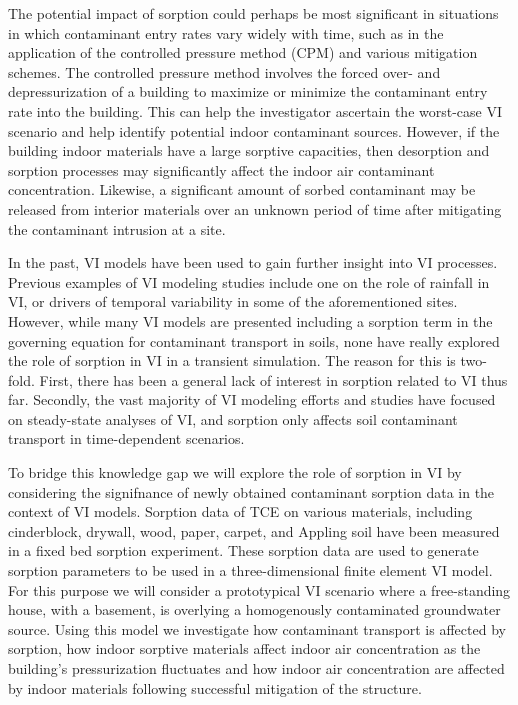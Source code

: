 The potential impact of sorption could perhaps be most significant in situations in which contaminant entry rates vary widely with time, such as in the application of the controlled pressure method (CPM) and various mitigation schemes.
The controlled pressure method involves the forced over- and depressurization of a building to maximize or minimize the contaminant entry rate into the building.
This can help the investigator ascertain the worst-case VI scenario and help identify potential indoor contaminant sources\cite{mchugh_recent_2017,holton_long-term_2015}.
However, if the building indoor materials have a large sorptive capacities, then desorption and sorption processes may significantly affect the indoor air contaminant concentration.
Likewise, a significant amount of sorbed contaminant may be released from interior materials over an unknown period of time after mitigating the contaminant intrusion at a site\cite{meininghaus_diffusion_2000,meininghaus_diffusion_2002}.\par

In the past, VI models have been used to gain further insight into VI processes\cite{johnson_heuristic_1991,little_transport_1992,shirazi_three-dimensional_2017}.
Previous examples of VI modeling studies include one on the role of rainfall in VI\cite{shen_numerical_2012}, or drivers of temporal variability in some of the aforementioned sites\cite{strom_factors_2019}.
However, while many VI models are presented including a sorption term in the governing equation for contaminant transport in soils, none have really explored the role of sorption in VI in a transient simulation.
The reason for this is two-fold.
First, there has been a general lack of interest in sorption related to VI thus far.
Secondly, the vast majority of VI modeling efforts and studies have focused on steady-state analyses of VI, and sorption only affects soil contaminant transport in time-dependent scenarios.\par

To bridge this knowledge gap we will explore the role of sorption in VI by considering the signifnance of newly obtained contaminant sorption data in the context of VI models.
Sorption data of TCE on various materials, including cinderblock, drywall, wood, paper, carpet, and Appling soil have been measured in a fixed bed sorption experiment.
These sorption data are used to generate sorption parameters to be used in a three-dimensional finite element VI model.
For this purpose we will consider a prototypical VI scenario where a free-standing house, with a basement, is overlying a homogenously contaminated groundwater source.
Using this model we investigate how contaminant transport is affected by sorption, how indoor sorptive materials affect indoor air concentration as the building's pressurization fluctuates and how indoor air concentration are affected by indoor materials following successful mitigation of the structure.\par
